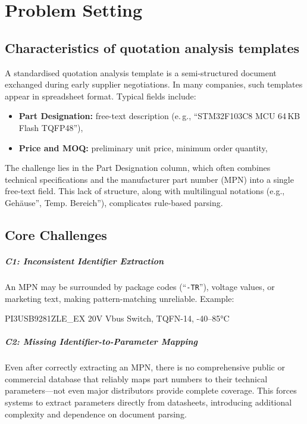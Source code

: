 \chapter{Problem Setting}
\label{chapter:problem}

\section{Characteristics of quotation analysis templates}
A standardised quotation analysis template is a semi-structured document exchanged during early supplier negotiations.  
In many companies, such templates appear in spreadsheet format.  
Typical fields include:  

\begin{itemize}
  \item \textbf{Part Designation:} free-text description (e.\,g., ``STM32F103C8 MCU 64\,KB Flash TQFP48''),
  \item \textbf{Price and MOQ:} preliminary unit price, minimum order quantity,
\end{itemize}

The challenge lies in the Part Designation column, which often combines technical specifications and the manufacturer part number (MPN) into a single free-text field.
This lack of structure, along with multilingual notations (e.g., Gehäuse'', Temp. Bereich''), complicates rule-based parsing.

\section{Core Challenges}
\paragraph{C1: Inconsistent Identifier Extraction}  
An MPN may be surrounded by package codes (``\texttt{-TR}''), voltage values, or marketing text, making pattern-matching unreliable.  
Example:  
\begin{center}
\ttfamily PI3USB9281ZLE\_EX   20V Vbus Switch, TQFN-14, -40–85°C
\end{center}

\paragraph{C2: Missing Identifier-to-Parameter Mapping}
Even after correctly extracting an MPN, there is no comprehensive public or commercial database that reliably maps part numbers to their technical parameters—not even major distributors provide complete coverage.
This forces systems to extract parameters directly from datasheets, introducing additional complexity and dependence on document parsing.

